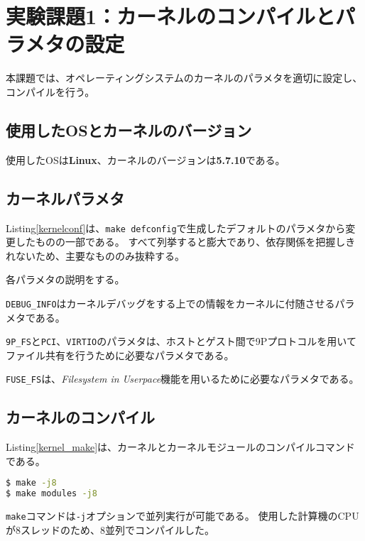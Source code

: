 \documentclass[main]{subfiles}
\begin{document}
\section{実験課題1：カーネルのコンパイルとパラメタの設定}

本課題では、オペレーティングシステムのカーネルのパラメタを適切に設定し、コンパイルを行う。

\subsection{使用したOSとカーネルのバージョン}

使用したOSは\textbf{Linux}、カーネルのバージョンは\textbf{5.7.10}である。

\subsection{カーネルパラメタ}

Listing\ref{kernelconf}は、\texttt{make defconfig}で生成したデフォルトのパラメタから変更したものの一部である。
すべて列挙すると膨大であり、依存関係を把握しきれないため、主要なもののみ抜粋する。



各パラメタの説明をする。

\texttt{DEBUG\_INFO}はカーネルデバッグをする上での情報をカーネルに付随させるパラメタである。

\texttt{9P\_FS}と\texttt{PCI}、\texttt{VIRTIO}のパラメタは、ホストとゲスト間で9Pプロトコルを用いてファイル共有を行うために必要なパラメタである。

\texttt{FUSE\_FS}は、\textit{Filesystem in Userpace}機能を用いるために必要なパラメタである。

\subsection{カーネルのコンパイル}

Listing\ref{kernel_make}は、カーネルとカーネルモジュールのコンパイルコマンドである。

\begin{lstlisting}[language=sh,label=kernel_make,caption=カーネルのコンパイル]
$ make -j8
$ make modules -j8
\end{lstlisting}

\texttt{make}コマンドは\texttt{-j}オプションで並列実行が可能である。
使用した計算機のCPUが8スレッドのため、8並列でコンパイルした。
\end{document}
